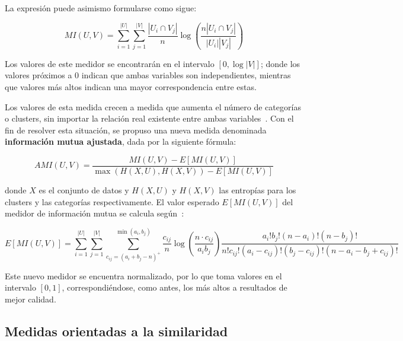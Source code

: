 La expresión puede asimismo formularse como sigue:

\begin{equation}
    \label{eq:mutual-information-cardinality}
    MI(U,V) = \sum_{i=1}^{|U|}\sum_{j=1}^{|V|}{\frac{|U_i \cap V_j|}{n}\log{\left( \frac{n|U_i \cap V_j|}{|U_i||V_j|} \right)}}
\end{equation}

Los valores de este medidor se encontrarán en el intervalo $[0,\log{|V|}]$;
donde los valores próximos a 0 indican que ambas variables son independientes, mientras que valores más altos indican una mayor correspondencia entre estas.

Los valores de esta medida crecen a medida que aumenta el número de categorías o clusters, sin importar la relación real existente entre ambas variables~\cite{Vinh10}.
Con el fin de resolver esta situación, se propuso una nueva medida denominada \textbf{información mutua ajustada}, dada por la siguiente fórmula:

\begin{equation}
    \label{eq:adjusted-mutual-information}
    AMI(U,V) = \frac{MI(U,V) - E[MI(U,V)]}{\max{(H(X, U), H(X, V)) - E[MI(U,V)]}}
\end{equation}

\noindent
donde $X$ es el conjunto de datos y $H(X,U)$ y $H(X,V)$ las entropías para los clusters y las categorías respectivamente.
El valor esperado $E[MI(U,V)]$ del medidor de información mutua se calcula según~\cite{Vinh10}:

{\footnotesize
\begin{equation*}
    \label{eq:expected-value-mutual-information}
    E[MI(U,V)] = \sum_{i=1}^{|U|}\sum_{j=1}^{|V|}\sum_{c_{ij}=(a_i+b_j-n)^{+}}^{\min{(a_i,b_j)}}
    {
    \frac{c_{ij}}{n}
    \log{\left( \frac{n \cdot c_{ij}}{a_i b_j} \right)}
    \frac{a_i ! b_j ! (n-a_i)!(n-b_j)!}{n!c_{ij}!(a_i-c_{ij})!(b_j-c_{ij})!(n-a_i-b_j+c_{ij})!}
    }
\end{equation*}
}

Este nuevo medidor se encuentra normalizado, por lo que toma valores en el intervalo $[0, 1]$, correspondiéndose, como antes, los más altos a resultados de mejor calidad.

\subsection{Medidas orientadas a la similaridad}\label{subsec:medidasOrientadasALaSimilaridad}

